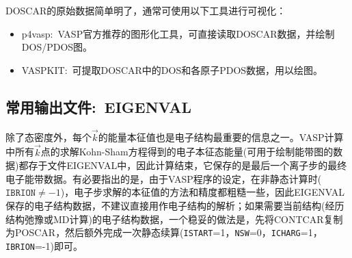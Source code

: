 %
%
%
\textrm{DOSCAR}的原始数据简单明了，通常可使用以下工具进行可视化：
\begin{itemize}
	\item \textrm{p4vasp}:~\textrm{VASP}官方推荐的图形化工具，可直接读取\textrm{DOSCAR}数据，并绘制\textrm{DOS/PDOS}图。
	\item \textrm{VASPKIT}:~可提取\textrm{DOSCAR}中的\textrm{DOS}和各原子\textrm{PDOS}数据，用以绘图。
\end{itemize}
%
%
%
%
%
\subsection{常用输出文件:~\rm{EIGENVAL}}\label{subsectr:EIGENVAL}
%
%

除了态密度外，每个$\vec k$的能量本征值也是电子结构最重要的信息之一。\textrm{VASP}计算中所有$\vec k$点的求解\textrm{Kohn-Sham}方程得到的电子本征态能量(可用于绘制能带图的数据)都存于文件\textrm{EIGENVAL}中，因此计算结束，它保存的是最后一个离子步的最终电子能带数据。有必要指出的是，由于\textrm{VASP}程序的设定，在非静态计算时($\mathtt{IBRION}\neq-1$)，电子步求解的本征值的方法和精度都粗糙一些，因此\textrm{EIGENVAL}保存的电子结构数据，不建议直接用作电子结构的解析；如果需要当前结构(经历结构弛豫或\textrm{MD}计算)的电子结构数据，一个稳妥的做法是，先将\textrm{CONTCAR}复制为\textrm{POSCAR}，然后额外完成一次静态续算(\texttt{ISTART}=1，\texttt{NSW}=0，\texttt{ICHARG}=1，\texttt{IBRION}=-1)即可。
%
%
%
%
%
%
%
%
%
%
